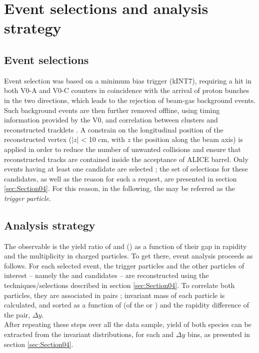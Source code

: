 \section{Event selections and analysis strategy}
\label{sec:Section03}

\subsection{Event selections}

Event selection was based on a minimum bias trigger (kINT7), requiring a hit in both V0-A and V0-C counters in coincidence with the arrival of proton bunches in the two directions, which leads to the rejection of beam-gas background events. Such background events are then further removed offline, using timing information provided by the V0, and correlation between clusters and reconstructed tracklets \cite{alice_collaboration_performance_2014}. A constrain on the longitudinal position of the reconstructed vertex ($|z|$ < 10 cm, with $z$ the position along the beam axis) is applied in order to reduce the number of unwanted collisions and ensure that reconstructed tracks are contained inside the acceptance of ALICE barrel. Only events having at least one \rmOmegaPM candidate are selected ; the set of selections for these candidates, as well as the reason for such a request, are presented in section \ref{sec:Section04}. For this reason, in the following, the \rmOmegaPM may be referred as the \textit{trigger particle}.

\subsection{Analysis strategy}

The observable is the yield ratio of \rmPhiMes and (\rmOmegas) as a function of their gap in rapidity and the multiplicity in charged particles. To get there, event analysis proceeds as follows. For each selected event, the trigger particles and the other particles of interest -- namely the \rmOmegaPM and \rmPhiMes candidates -- are reconstructed using the techniques/selections described in section \ref{sec:Section04}. To correlate both particles, they are associated in pairs ; invariant mass of each particle is calculated, and sorted as a function of \pT (of the \rmOmegaPM or \rmPhiMes) and the rapidity difference of the pair, $\Delta y$. \\
After repeating these steps over all the data sample, yield of both species can be extracted from the invariant distributions, for each \pT and $\Delta y$ bins, as presented in section \ref{sec:Section04}. 

